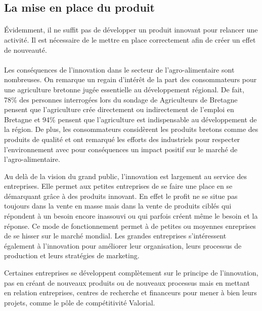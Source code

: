 \documentclass[a4paper,12pt]{report}
\begin{document}
		\subsection{La mise en place du produit}
		\paragraph{}Évidemment, il ne suffit pas de développer un produit innovant pour relancer une activité. Il est nécessaire de le mettre en place correctement afin de créer un effet de nouveauté.
		
		\paragraph{}Les conséquences de l’innovation dans le secteur de l’agro-alimentaire sont nombreuses. On remarque un regain d’intérêt de la part des consommateurs pour une agriculture bretonne jugée essentielle au développement régional. De fait, 78\% des personnes interrogées lors du sondage de Agriculteurs de Bretagne pensent que l’agriculture crée directement ou indirectement de l’emploi en Bretagne et 94\% pensent que l’agriculture est indispensable au développement de la région\cite{AgriculteursDeBretagne}. De plus, les consommateurs considèrent les produits bretons comme des produits de qualité et ont remarqué les efforts des industriels pour respecter l’environnement avec pour conséquences un impact positif sur le marché de l’agro-alimentaire.

    Au delà de la vision du grand public, l’innovation est largement au service des entreprises. Elle permet aux petites entreprises de se faire une place en se démarquant grâce à des produits innovant. En effet le profit ne se situe pas toujours dans la vente en masse mais dans la vente de produits ciblés qui répondent à un besoin encore inassouvi ou qui parfois créent même le besoin et la réponse. Ce mode de fonctionnement permet à de petites ou moyennes enreprises de se hisser sur le marché mondial.
Les grandes entreprises s’intéressent également à l’innovation pour améliorer leur organisation, leurs processus de production et leurs stratégies de marketing.

	Certaines entreprises se développent complètement sur le principe de l’innovation, pas en créant de nouveaux produits ou de nouveaux processus mais en mettant en relation entreprises, centres de recherche et financeurs pour mener à bien leurs projets, comme le pôle de compétitivité Valorial.
\end{document}
